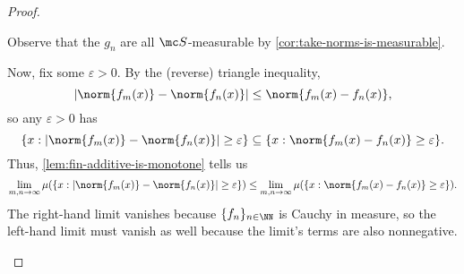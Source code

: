 \documentclass[../notes.tex]{subfiles}
\begin{document}
\begin{proof}
\begin{listalph}
		\item Observe that the $g_n$ are all $\mc S$-measurable by \autoref{cor:take-norms-is-measurable}.

		Now, fix some $\varepsilon>0$. By the (reverse) triangle inequality,
		\[|\norm{f_m(x)}-\norm{f_n(x)}|\le\norm{f_m(x)-f_n(x)},\]
		so any $\varepsilon>0$ has
		\[\{x:|\norm{f_m(x)}-\norm{f_n(x)}|\ge\varepsilon\}\subseteq\{x:\norm{f_m(x)-f_n(x)}\ge\varepsilon\}.\]
		Thus, \autoref{lem:fin-additive-is-monotone} tells us
		\[\lim_{m,n\to\infty}\mu(\{x:|\norm{f_m(x)}-\norm{f_n(x)}|\ge\varepsilon\})\le\lim_{m,n\to\infty}\mu(\{x:\norm{f_m(x)-f_n(x)}\ge\varepsilon\}).\]
		The right-hand limit vanishes because $\{f_n\}_{n\in\NN}$ is Cauchy in measure, so the left-hand limit must vanish as well because the limit's terms are also nonnegative.
		\qedhere
	\end{listalph}
\end{proof}
\end{document}
